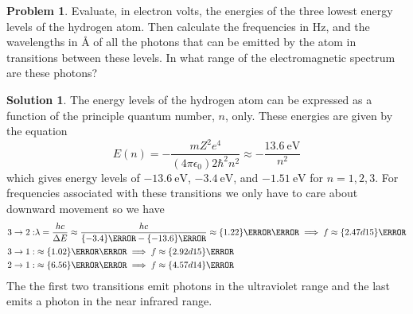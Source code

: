 \documentclass[10pt]{article}
\theoremstyle{definition}
\newtheorem{problem}{Problem}
\newtheorem{soln}{Solution}
\begin{document}
\begin{problem}
Evaluate, in electron volts, the energies of the three lowest energy levels of the hydrogen atom. Then
calculate the frequencies in $\unit{\hertz}$, and the wavelengths in $\unit{\angstrom}$ of all the photons that can be emitted by the
atom in transitions between these levels. In what range of the electromagnetic spectrum are these photons?
\end{problem}
\begin{soln}
  The energy levels of the hydrogen atom can be expressed as a function of the principle quantum number, $n$, only. These
  energies are given by the equation
  $$E(n)=-\frac{mZ^2e^4}{\left(4\pi\epsilon_0\right)2\hbar^2n^2}\approx-\frac{\qty{13.6}{\electronvolt}}{n^2}$$
  which gives energy levels of $\qty{-13.6}{\electronvolt}$, $\qty{-3.4}{\electronvolt}$, and $\qty{-1.51}{\electronvolt}$
  for $n=1,2,3$. For frequencies associated with these transitions we only have to care about downward movement so we have
  \begin{align*}
    3\to 2  : & \lambda=\frac{hc}{\Delta E}\approx\frac{hc}{\qty{-3.4}{\electronvolt}-\qty{-13.6}{\electronvolt}}\approx\qty{1.22}{\kilo\angstrom}
    \implies f\approx\qty{2.47d15}{\hertz}                                                                                                         \\
    3\to 1  : & \approx\qty{1.02}{\kilo\angstrom}\implies f\approx\qty{2.92d15}{\hertz}                                                            \\
    2\to 1  : & \approx\qty{6.56}{\kilo\angstrom}\implies f\approx\qty{4.57d14}{\hertz}
  \end{align*}
  The the first two transitions emit photons in the ultraviolet range and the last emits a photon in the near infrared range.
\end{soln}
\newpage
\end{document}
